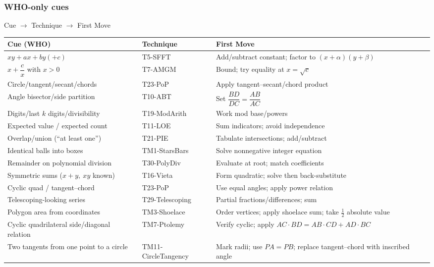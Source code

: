 \documentclass{article}
\begin{document}
\subsubsection{WHO-only cues}
\begin{classifybox}{Cue $\rightarrow$ Technique $\rightarrow$ First Move}
\begin{center}
\begin{tabularx}{\textwidth}{|>{\raggedright\arraybackslash}X|>{\raggedright\arraybackslash}m{}|>{\raggedright\arraybackslash}X|}
\hline
\textbf{Cue (WHO)} & \textbf{Technique} & \textbf{First Move} \\
\hline
$xy + ax + by (+ c)$ & T5-SFFT & Add/subtract constant; factor to $(x+\alpha)(y+\beta)$ \\
$x + \dfrac{c}{x}$ with $x>0$ & T7-AMGM & Bound; try equality at $x=\sqrt{c}$ \\
Circle/tangent/secant/chords & T23-PoP & Apply tangent--secant/chord product \\
Angle bisector/side partition & T10-ABT & Set $\dfrac{BD}{DC}=\dfrac{AB}{AC}$ \\
Digits/last $k$ digits/divisibility & T19-ModArith & Work mod base/powers \\
Expected value / expected count & T11-LOE & Sum indicators; avoid independence \\
Overlap/union (``at least one'') & T21-PIE & Tabulate intersections; add/subtract \\
Identical balls into boxes & TM1-StarsBars & Solve nonnegative integer equation \\
Remainder on polynomial division & T30-PolyDiv & Evaluate at root; match coefficients \\
Symmetric sums ($x+y,\ xy$ known) & T16-Vieta & Form quadratic; solve then back-substitute \\
Cyclic quad / tangent--chord & T23-PoP & Use equal angles; apply power relation \\
Telescoping-looking series & T29-Telescoping & Partial fractions/differences; sum \\
Polygon area from coordinates & TM3-Shoelace & Order vertices; apply shoelace sum; take $\tfrac{1}{2}$ absolute value \\
Cyclic quadrilateral side/diagonal relation & TM7-Ptolemy & Verify cyclic; apply $AC\cdot BD=AB\cdot CD+AD\cdot BC$ \\
Two tangents from one point to a circle & TM11-CircleTangency & Mark radii; use $PA=PB$; replace tangent--chord with inscribed angle \\

\end{tabularx}
\end{center}
\end{classifybox}
\end{document}
